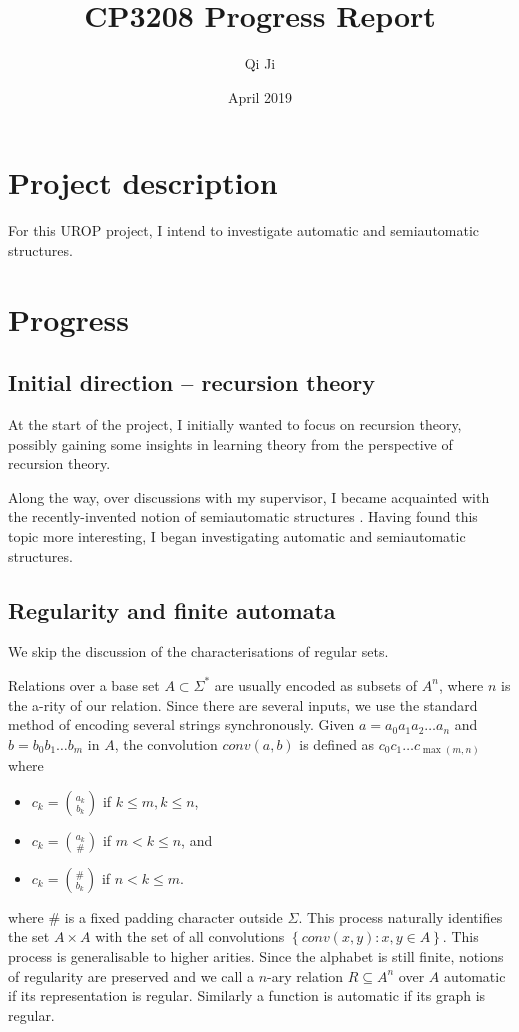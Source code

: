 \documentclass[british,a4paper,]{scrartcl}
\title{CP3208 Progress Report}
\author{Qi Ji}
\date{April 2019}
\theoremstyle{definition}
\theoremstyle{remark}
\newcommand{\set}[1]{\left\{ #1 \right\}}
\begin{document}
\maketitle

\section{Project description}

For this UROP project, I intend to investigate automatic and semiautomatic structures.

\section{Progress}

\subsection{Initial direction -- recursion theory}

At the start of the project, I initially wanted to focus on recursion theory, possibly gaining some insights in learning theory from the perspective of recursion theory.

Along the way, over discussions with my supervisor, I became acquainted with the recently-invented notion of semiautomatic structures \autocite{semiauto}.
Having found this topic more interesting, I began investigating automatic and semiautomatic structures.

\subsection{Regularity and finite automata}

We skip the discussion of the characterisations of regular sets.

Relations over a base set \(A \subset \Sigma^*\) are usually encoded as subsets of \(A^n\),
where \(n\) is the a-rity of our relation.
Since there are several inputs, we use the standard method of encoding several strings synchronously.
Given \(a = a_0a_1a_2\dots a_n\) and \(b = b_0b_1\dots b_m\) in \(A\),
the convolution \(conv(a,b)\) is defined as \(c_0c_1\dots c_{\max(m,n)}\) where
\begin{itemize}
    \item \(c_k = \binom{a_k}{b_k}\) if \(k\leq m, k\leq n\),
    \item \(c_k = \binom{a_k}{\#}\) if \(m < k \leq n\), and
    \item \(c_k = \binom{\#}{b_k}\) if \(n < k \leq m\).
\end{itemize}
where \(\#\) is a fixed padding character outside \(\Sigma\).
This process naturally identifies the set \(A\times A\) with the set of all convolutions \(\set{conv(x,y) : x,y\in A}\).
This process is generalisable to higher arities.
Since the alphabet is still finite, notions of regularity are preserved and we call a \(n\)-ary relation \(R\subseteq A^n\) over \(A\) automatic if its representation is regular.
Similarly a function is automatic if its graph is regular.
\end{document}
